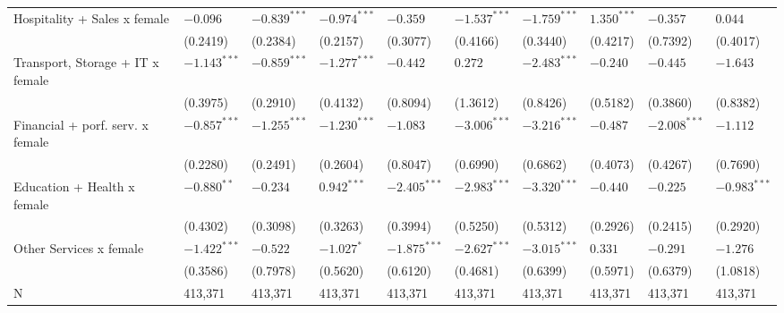 \begin{tabular}{llllllllll}
Hospitality + Sales x female     &        $-0.096$ &  $-0.839^{***}$ &  $-0.974^{***}$ &        $-0.359$ &  $-1.537^{***}$ &  $-1.759^{***}$ &   $1.350^{***}$ &        $-0.357$ &         $0.044$ \\
                                 &        (0.2419) &        (0.2384) &        (0.2157) &        (0.3077) &        (0.4166) &        (0.3440) &        (0.4217) &        (0.7392) &        (0.4017) \\
Transport, Storage + IT x female &  $-1.143^{***}$ &  $-0.859^{***}$ &  $-1.277^{***}$ &        $-0.442$ &         $0.272$ &  $-2.483^{***}$ &        $-0.240$ &        $-0.445$ &        $-1.643$ \\
                                 &        (0.3975) &        (0.2910) &        (0.4132) &        (0.8094) &        (1.3612) &        (0.8426) &        (0.5182) &        (0.3860) &        (0.8382) \\
Financial + porf. serv. x female &  $-0.857^{***}$ &  $-1.255^{***}$ &  $-1.230^{***}$ &        $-1.083$ &  $-3.006^{***}$ &  $-3.216^{***}$ &        $-0.487$ &  $-2.008^{***}$ &        $-1.112$ \\
                                 &        (0.2280) &        (0.2491) &        (0.2604) &        (0.8047) &        (0.6990) &        (0.6862) &        (0.4073) &        (0.4267) &        (0.7690) \\
Education + Health x female      &   $-0.880^{**}$ &        $-0.234$ &   $0.942^{***}$ &  $-2.405^{***}$ &  $-2.983^{***}$ &  $-3.320^{***}$ &        $-0.440$ &        $-0.225$ &  $-0.983^{***}$ \\
                                 &        (0.4302) &        (0.3098) &        (0.3263) &        (0.3994) &        (0.5250) &        (0.5312) &        (0.2926) &        (0.2415) &        (0.2920) \\
Other Services x female          &  $-1.422^{***}$ &        $-0.522$ &      $-1.027^*$ &  $-1.875^{***}$ &  $-2.627^{***}$ &  $-3.015^{***}$ &         $0.331$ &        $-0.291$ &        $-1.276$ \\
                                 &        (0.3586) &        (0.7978) &        (0.5620) &        (0.6120) &        (0.4681) &        (0.6399) &        (0.5971) &        (0.6379) &        (1.0818) \\
N                                &         413,371 &         413,371 &         413,371 &         413,371 &         413,371 &         413,371 &         413,371 &         413,371 &         413,371 \\
\bottomrule
\end{tabular}
